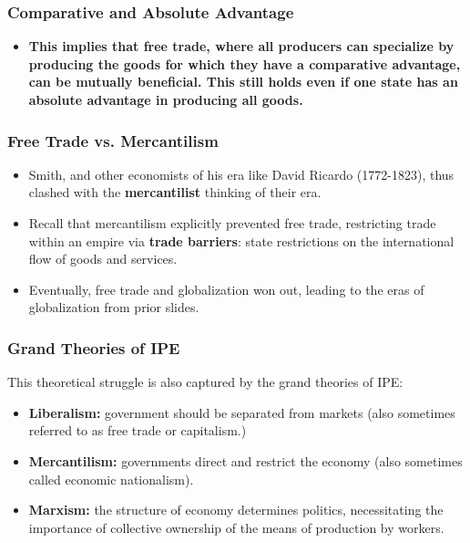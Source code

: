 \documentclass{beamer}
\begin{document}
\begin{frame} 
	\frametitle{\LARGE{Comparative and Absolute Advantage}}
	\begin{itemize}
		\item \textbf{This implies that free trade, where all producers can specialize by producing the goods for which they have a comparative advantage, can be mutually beneficial. This still holds even if one state has an absolute advantage in producing all goods.}
	\end{itemize}
\end{frame}

\begin{frame} 
	\frametitle{\LARGE{Free Trade vs. Mercantilism}}
	\begin{itemize}
		\item Smith, and other economists of his era like David Ricardo (1772-1823), thus clashed with the \textbf{mercantilist} thinking of their era. \pause
		\item Recall that mercantilism explicitly prevented free trade, restricting trade within an empire via \textbf{trade barriers}: state restrictions on the international flow of goods and services. \pause
		\item Eventually, free trade and globalization won out, leading to the eras of globalization from prior slides.
	\end{itemize}
\end{frame}

\begin{frame} 
	\frametitle{\LARGE{Grand Theories of IPE}}
This theoretical struggle is also captured by the grand theories of IPE:
	\begin{itemize}
			\item \textbf{Liberalism:} government should be separated from markets (also sometimes referred to as free trade or capitalism.) \pause 
			\item \textbf{Mercantilism:} governments direct and restrict the economy (also sometimes called economic nationalism). \pause 
			\item \textbf{Marxism:} the structure of economy determines politics, necessitating the importance of collective ownership of the means of production by workers.  
	\end{itemize}
\end{frame}
\end{document}
